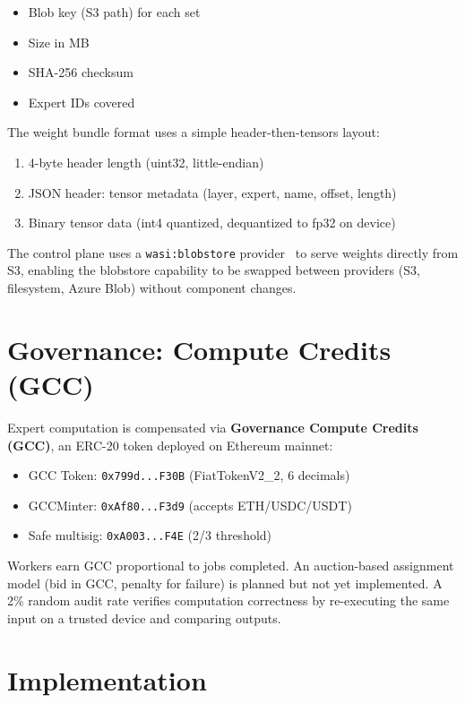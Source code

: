 \documentclass[11pt,a4paper]{article}
\begin{document}
\begin{itemize}
  \item Blob key (S3 path) for each set
  \item Size in MB
  \item SHA-256 checksum
  \item Expert IDs covered
\end{itemize}

The weight bundle format uses a simple header-then-tensors layout:
\begin{enumerate}
  \item 4-byte header length (uint32, little-endian)
  \item JSON header: tensor metadata (layer, expert, name, offset, length)
  \item Binary tensor data (int4 quantized, dequantized to fp32 on device)
\end{enumerate}

The control plane uses a \texttt{wasi:blobstore}
provider~\cite{wasiblobstore} to serve weights directly from S3,
enabling the blobstore capability to be swapped between providers
(S3, filesystem, Azure Blob) without component changes.

\section{Governance: Compute Credits (GCC)}
\label{sec:gcc}

Expert computation is compensated via \textbf{Governance Compute
Credits (GCC)}, an ERC-20 token deployed on Ethereum mainnet:

\begin{itemize}
  \item GCC Token: \texttt{0x799d...F30B} (FiatTokenV2\_2, 6 decimals)
  \item GCCMinter: \texttt{0xAf80...F3d9} (accepts ETH/USDC/USDT)
  \item Safe multisig: \texttt{0xA003...F4E} (2/3 threshold)
\end{itemize}

Workers earn GCC proportional to jobs completed. An auction-based
assignment model (bid in GCC, penalty for failure) is planned but not
yet implemented. A 2\% random audit rate verifies computation
correctness by re-executing the same input on a trusted device and
comparing outputs.

\section{Implementation}
\label{sec:impl}
\end{document}
